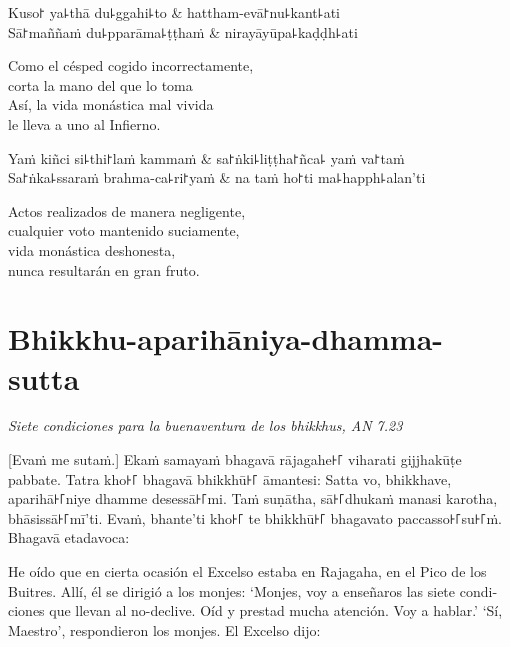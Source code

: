 \begin{twochants}
	Kuso꜓ ya꜕thā du꜕ggahi꜕to & hattham-evā꜓nu꜕kant꜕ati \\
	Sā꜓maññaṁ du꜕pparāma꜕ṭṭhaṁ & nirayāyūpa꜕kaḍḍh꜕ati \\
\end{twochants}

\begin{english}
	Como el césped cogido incorrectamente,\\
	corta la mano del que lo toma\\
	Así, la vida monástica mal vivida\\
	le lleva a uno al Infierno.
\end{english}

\begin{twochants}
	Yaṁ kiñci si꜕thi꜓laṁ kammaṁ & sa꜓ṅki꜕liṭṭha꜓ñca꜕ yaṁ va꜓taṁ \\
	Sa꜓ṅka꜕ssaraṁ brahma-ca꜕ri꜓yaṁ & na taṁ ho꜓ti ma꜕happh꜕alan'ti \\
\end{twochants}

\begin{english}
	Actos realizados de manera negligente,\\
	cualquier voto mantenido suciamente,\\
	vida monástica deshonesta,\\
	nunca resultarán en gran fruto.
\end{english}

\chapter[Aparihāniya-dhamma-sutta]{Bhikkhu-aparihāniya-dhamma-sutta}

\emph{Siete condiciones para la buenaventura de los bhikkhus, AN 7.23}

\begin{leader}
\end{leader}

[Evaṁ me sutaṁ.] Ekaṁ samayaṁ bhagavā rājagahe꜔꜒ viharati gijjhakūṭe pabbate.
Tatra kho꜔꜒ bhagavā bhikkhū꜔꜒ āmantesi: Satta vo, bhikkhave, aparihā꜔꜒niye dhamme
desessā꜔꜒mi. Taṁ suṇātha, sā꜔꜒dhukaṁ manasi karotha, bhāsissā꜔꜒mī'ti. Evaṁ, bhante'ti
kho꜔꜒ te bhikkhū꜔꜒ bhagavato paccasso꜔꜒su꜔꜒ṁ. Bhagavā etadavoca:

\begin{english}
  He oído que en cierta ocasión el Excelso estaba en Rajagaha, en el Pico de los Buitres. Allí, él se dirigió a los monjes: ‘Monjes, voy a enseñaros las siete condiciones que llevan al no-declive. Oíd y prestad mucha atención. Voy a hablar.’ ‘Sí, Maestro’, respondieron los monjes. El Excelso dijo:
\end{english}

